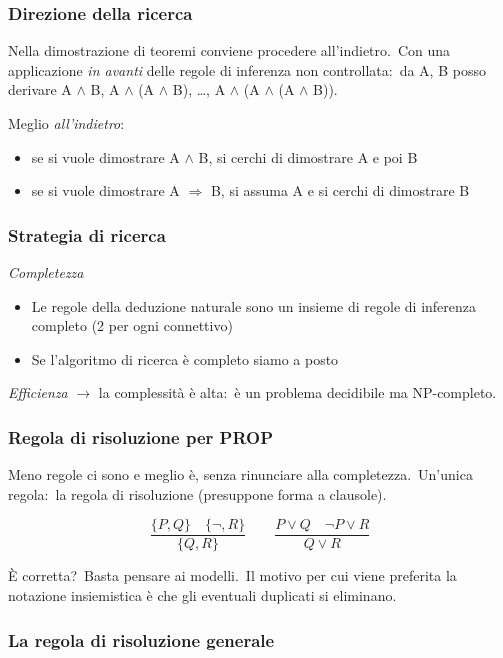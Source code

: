 \subsubsection{Direzione della ricerca}
Nella dimostrazione di teoremi conviene procedere all'indietro.\
Con una applicazione \textit{in avanti} delle regole di inferenza non controllata:\ da A, B posso derivare A $\land$ B, A $\land$ (A $\land$ B), \dots, A $\land$ (A $\land$ (A $\land$ B)).

Meglio \textit{all'indietro}:
\begin{itemize}
	\item se si vuole dimostrare A $\land$ B, si cerchi di dimostrare A e poi B
	\item se si vuole dimostrare A $\Rightarrow$ B, si assuma A e si cerchi di dimostrare B
\end{itemize}

\subsubsection{Strategia di ricerca}

\textit{Completezza}
\begin{itemize}
	\item Le regole della deduzione naturale sono un insieme di regole di inferenza completo (2 per ogni connettivo)
	\item Se l'algoritmo di ricerca è completo siamo a posto
\end{itemize}
\textit{Efficienza} $\rightarrow$ la complessità è alta:\ è un problema decidibile ma NP-completo.

\subsubsection{Regola di risoluzione per PROP}

Meno regole ci sono e meglio è, senza rinunciare alla completezza.\
Un'unica regola:\ la regola di risoluzione (presuppone forma a clausole).

\[
	\frac{\{P,Q\}\quad \{\lnot,R\}}{\{Q,R\}} \qquad \frac{P\lor Q\quad \lnot P \lor R}{Q \lor R}
\]

\noindent È corretta?\ Basta pensare ai modelli.\
Il motivo per cui viene preferita la notazione insiemistica è che gli eventuali duplicati si eliminano.

\subsubsection{La regola di risoluzione generale}

